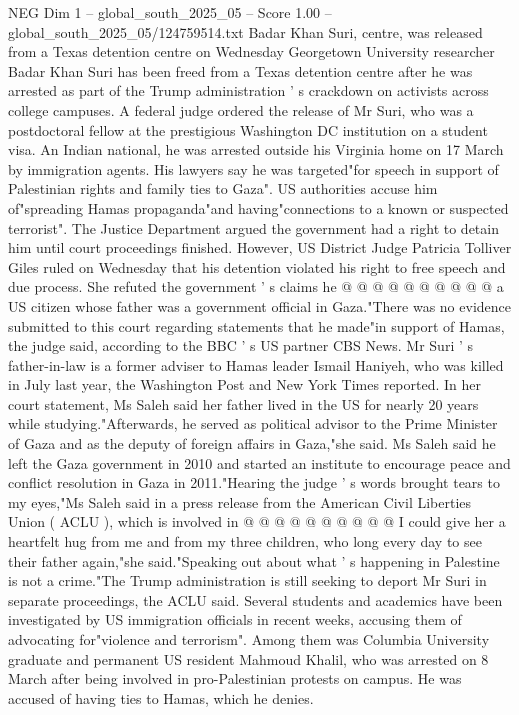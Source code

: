 \begin{textsample}{NEG Dim 1 – global\_south\_2025\_05 – Score 1.00 – global\_south\_2025\_05/124759514.txt}  \label{ex:f1_neg_384}
Badar Khan Suri, centre, was released from a Texas detention centre on Wednesday Georgetown University researcher Badar Khan Suri has been freed from a Texas detention centre after he was arrested as part of the Trump administration ' s crackdown on activists across college campuses.
A federal judge ordered the release of Mr Suri, who was a postdoctoral fellow at the prestigious Washington DC institution on a student visa.
An Indian national, he was arrested outside his Virginia home on 17 March by immigration agents.
His lawyers say he was targeted"for speech in support of Palestinian rights and family ties to Gaza".
US authorities accuse him of"spreading Hamas propaganda"and having"connections to a known or suspected terrorist".
The Justice Department argued the government had a right to detain him until court proceedings finished.
However, US District Judge Patricia Tolliver Giles ruled on Wednesday that his detention violated his right to free speech and due process.
She refuted the government ' s claims he @ @ @ @ @ @ @ @ @ @ a US citizen whose father was a government official in Gaza."There was no evidence submitted to this court regarding statements that he made"in support of Hamas, the judge said, according to the BBC ' s US partner CBS News.
Mr Suri ' s father-in-law is a former adviser to Hamas leader Ismail Haniyeh, who was killed in July last year, the Washington Post and New York Times reported.
In her court statement, Ms Saleh said her father lived in the US for nearly 20 years while studying."Afterwards, he served as political advisor to the Prime Minister of Gaza and as the deputy of foreign affairs in Gaza,"she said.
Ms Saleh said he left the Gaza government in 2010 and started an institute to encourage peace and conflict resolution in Gaza in 2011."Hearing the judge ' s words brought tears to my eyes,"Ms Saleh said in a press release from the American Civil Liberties Union ( ACLU ), which is involved in @ @ @ @ @ @ @ @ @ @ I could give her a heartfelt hug from me and from my three children, who long every day to see their father again,"she said."Speaking out about what ' s happening in Palestine is not a crime."The Trump administration is still seeking to deport Mr Suri in separate proceedings, the ACLU said.
Several students and academics have been investigated by US immigration officials in recent weeks, accusing them of advocating for"violence and terrorism".
Among them was Columbia University graduate and permanent US resident Mahmoud Khalil, who was arrested on 8 March after being involved in pro-Palestinian protests on campus.
He was accused of having ties to Hamas, which he denies.

\end{textsample}
